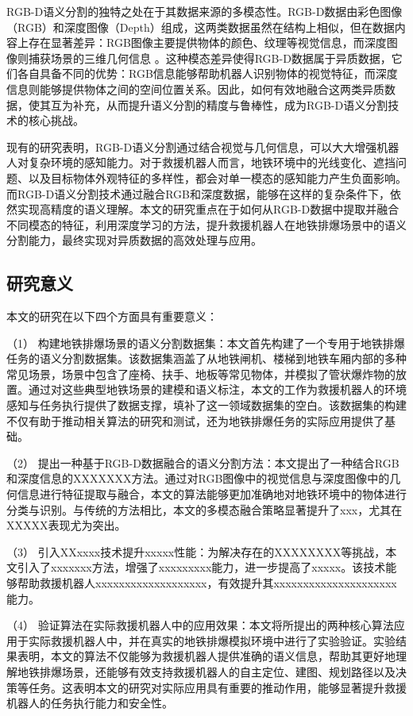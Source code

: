 RGB-D语义分割的独特之处在于其数据来源的多模态性。RGB-D数据由彩色图像（RGB）和深度图像（Depth）组成，这两类数据虽然在结构上相似，但在数据内容上存在显著差异：RGB图像主要提供物体的颜色、纹理等视觉信息，而深度图像则捕获场景的三维几何信息 。这种模态差异使得RGB-D数据属于异质数据，它们各自具备不同的优势：RGB信息能够帮助机器人识别物体的视觉特征，而深度信息则能够提供物体之间的空间位置关系。因此，如何有效地融合这两类异质数据，使其互为补充，从而提升语义分割的精度与鲁棒性，成为RGB-D语义分割技术的核心挑战。

现有的研究表明，RGB-D语义分割通过结合视觉与几何信息，可以大大增强机器人对复杂环境的感知能力。对于救援机器人而言，地铁环境中的光线变化、遮挡问题、以及目标物体外观特征的多样性，都会对单一模态的感知能力产生负面影响。而RGB-D语义分割技术通过融合RGB和深度数据，能够在这样的复杂条件下，依然实现高精度的语义理解。本文的研究重点在于如何从RGB-D数据中提取并融合不同模态的特征，利用深度学习的方法，提升救援机器人在地铁排爆场景中的语义分割能力，最终实现对异质数据的高效处理与应用。



\subsection{研究意义}
本文的研究在以下四个方面具有重要意义：

（1）  
构建地铁排爆场景的语义分割数据集：本文首先构建了一个专用于地铁排爆任务的语义分割数据集。该数据集涵盖了从地铁闸机、楼梯到地铁车厢内部的多种常见场景，场景中包含了座椅、扶手、地板等常见物体，并模拟了管状爆炸物的放置。通过对这些典型地铁场景的建模和语义标注，本文的工作为救援机器人的环境感知与任务执行提供了数据支撑，填补了这一领域数据集的空白。该数据集的构建不仅有助于推动相关算法的研究和测试，还为地铁排爆任务的实际应用提供了基础。

（2）  提出一种基于RGB-D数据融合的语义分割方法：本文提出了一种结合RGB和深度信息的XXXXXXX方法。通过对RGB图像中的视觉信息与深度图像中的几何信息进行特征提取与融合，本文的算法能够更加准确地对地铁环境中的物体进行分类与识别。与传统的方法相比，本文的多模态融合策略显著提升了xxx，尤其在XXXXX表现尤为突出。

（3）
引入XXxxxx技术提升xxxxx性能：为解决存在的XXXXXXXX等挑战，本文引入了xxxxxxx方法，增强了xxxxxxxxx能力，进一步提高了xxxxx。该技术能够帮助救援机器人xxxxxxxxxxxxxxxxxxx，有效提升其xxxxxxxxxxxxxxxxxxxxx能力。


（4）
验证算法在实际救援机器人中的应用效果：本文将所提出的两种核心算法应用于实际救援机器人中，并在真实的地铁排爆模拟环境中进行了实验验证。实验结果表明，本文的算法不仅能够为救援机器人提供准确的语义信息，帮助其更好地理解地铁排爆场景，还能够有效支持救援机器人的自主定位、建图、规划路径以及决策等任务。这表明本文的研究对实际应用具有重要的推动作用，能够显著提升救援机器人的任务执行能力和安全性。

